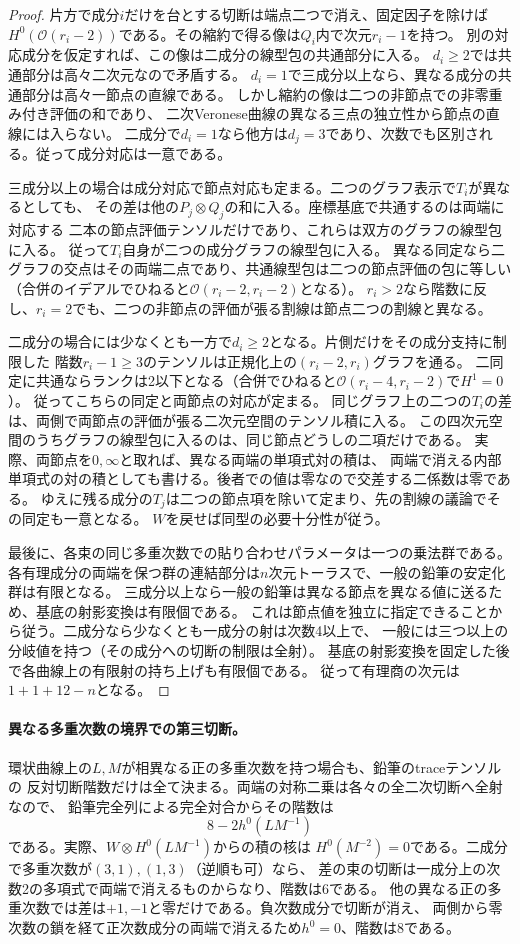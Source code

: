 \begin{proof}
片方で成分$i$だけを台とする切断は端点二つで消え、固定因子を除けば
$H^0(\mathcal O(r_i-2))$である。その縮約で得る像は$Q_i$内で次元$r_i-1$を持つ。
別の対応成分を仮定すれば、この像は二成分の線型包の共通部分に入る。
$d_i\ge2$では共通部分は高々二次元なので矛盾する。
$d_i=1$で三成分以上なら、異なる成分の共通部分は高々一節点の直線である。
しかし縮約の像は二つの非節点での非零重み付き評価の和であり、
二次Veronese曲線の異なる三点の独立性から節点の直線には入らない。
二成分で$d_i=1$なら他方は$d_j=3$であり、次数でも区別される。従って成分対応は一意である。

三成分以上の場合は成分対応で節点対応も定まる。二つのグラフ表示で$T_i$が異なるとしても、
その差は他の$P_j\otimes Q_j$の和に入る。座標基底で共通するのは両端に対応する
二本の節点評価テンソルだけであり、これらは双方のグラフの線型包に入る。
従って$T_i$自身が二つの成分グラフの線型包に入る。
異なる同定なら二グラフの交点はその両端二点であり、共通線型包は二つの節点評価の包に等しい
（合併のイデアルでひねると$\mathcal O(r_i-2,r_i-2)$となる）。
$r_i>2$なら階数に反し、$r_i=2$でも、二つの非節点の評価が張る割線は節点二つの割線と異なる。

二成分の場合には少なくとも一方で$d_i\ge2$となる。片側だけをその成分支持に制限した
階数$r_i-1\ge3$のテンソルは正規化上の$(r_i-2,r_i)$グラフを通る。
二同定に共通ならランクは2以下となる（合併でひねると$\mathcal O(r_i-4,r_i-2)$で$H^1=0$）。
従ってこちらの同定と両節点の対応が定まる。
同じグラフ上の二つの$T_i$の差は、両側で両節点の評価が張る二次元空間のテンソル積に入る。
この四次元空間のうちグラフの線型包に入るのは、同じ節点どうしの二項だけである。
実際、両節点を$0,\infty$と取れば、異なる両端の単項式対の積は、
両端で消える内部単項式の対の積としても書ける。後者での値は零なので交差する二係数は零である。
ゆえに残る成分の$T_j$は二つの節点項を除いて定まり、先の割線の議論でその同定も一意となる。
$W$を戻せば同型の必要十分性が従う。

最後に、各束の同じ多重次数での貼り合わせパラメータは一つの乗法群である。
各有理成分の両端を保つ群の連結部分は$n$次元トーラスで、一般の鉛筆の安定化群は有限となる。
三成分以上なら一般の鉛筆は異なる節点を異なる値に送るため、基底の射影変換は有限個である。
これは節点値を独立に指定できることから従う。二成分なら少なくとも一成分の射は次数4以上で、
一般には三つ以上の分岐値を持つ（その成分への切断の制限は全射）。
基底の射影変換を固定した後で各曲線上の有限射の持ち上げも有限個である。
従って有理商の次元は$1+1+12-n$となる。
\end{proof}

\paragraph{異なる多重次数の境界での第三切断。}
環状曲線上の$L,M$が相異なる正の多重次数を持つ場合も、鉛筆のtraceテンソルの
反対切断階数だけは全て決まる。両端の対称二乗は各々の全二次切断へ全射なので、
鉛筆完全列による完全対合からその階数は
\[
 8-2h^0(LM^{-1})
\]
である。実際、$W\otimes H^0(LM^{-1})$からの積の核は
$H^0(M^{-2})=0$である。二成分で多重次数が$(3,1),(1,3)$（逆順も可）なら、
差の束の切断は一成分上の次数2の多項式で両端で消えるものからなり、階数は6である。
他の異なる正の多重次数では差は$+1,-1$と零だけである。負次数成分で切断が消え、
両側から零次数の鎖を経て正次数成分の両端で消えるため$h^0=0$、階数は8である。

